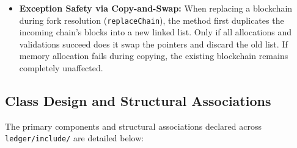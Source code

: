 \documentclass[11pt,a4paper]{report}
\begin{document}
\begin{itemize}
    \item \textbf{Exception Safety via Copy-and-Swap:}
    When replacing a blockchain during fork resolution (\texttt{replaceChain}), the method first duplicates the incoming chain's blocks into a new linked list. Only if all allocations and validations succeed does it swap the pointers and discard the old list. If memory allocation fails during copying, the existing blockchain remains completely unaffected.
\end{itemize}

\clearpage

\subsection{Class Design and Structural Associations}

The primary components and structural associations declared across \texttt{ledger/include/} are detailed below:
\end{document}
